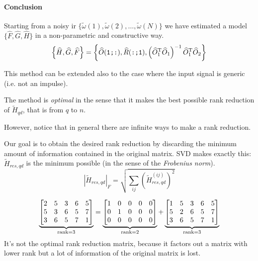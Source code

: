 \paragraph{Conclusion} Starting from a noisy \gls{ir} $\{\widetilde{\omega}(1), \widetilde{\omega}(2), \ldots, \widetilde{\omega}(N)\}$ we have estimated a model $\{\hat{F}, \hat{G}, \hat{H}\}$ in a non-parametric and constructive way.
\[ \left\{\widehat{H}, \widehat{G}, \widehat{F} \right\} = \left \{\widehat{O}(\texttt{1;:}), \widehat{R}(\texttt{:;1}), \left(\widehat{O}_1^{\mathrm{T}}\widehat{O}_1\right)^{-1} \widehat{O}_1^{\mathrm{T}}\widehat{O}_2\right \}\]

\begin{remark}
    This method can be extended also to the case where the input signal is generic (i.e. not an impulse).
\end{remark}

\begin{remark}
    The method is \emph{optimal} in the sense that it makes the best possible rank reduction of $\tilde{H}_{qd}$, that is from $q$ to $n$.
    
    However, notice that in general there are infinite ways to make a rank reduction.
\end{remark}

\begin{remark}
Our goal is to obtain the desired rank reduction by discarding the minimum amount of information contained in the original matrix.
SVD makes exactly this: $\tilde{H}_{res,qd}$ is the minimum possible (in the sense of the \emph{Frobenius norm}).
\[
    \left|\tilde{H}_{res,qd}\right|_F = \sqrt{\sum_{ij} \left(\tilde{H}_{res,qd}^{(ij)} \right)^2}
\]
    
\end{remark}

\begin{example}
    \[
        \underbrace{\begin{bmatrix}
            2 & 5 & 3 & 6 & 5 \\
            5 & 3 & 6 & 5 & 7 \\
            3 & 6 & 5 & 7 & 1
        \end{bmatrix}}_{\operatorname*{rank} = 3}
        =
        \underbrace{\begin{bmatrix}
            1 & 0 & 0 & 0 & 0 \\
            0 & 1 & 0 & 0 & 0 \\
            0 & 0 & 0 & 0 & 0
        \end{bmatrix}}_{\operatorname*{rank} = 2}
        +
        \underbrace{
        \begin{bmatrix}
            1 & 5 & 3 & 6 & 5 \\
            5 & 2 & 6 & 5 & 7 \\
            3 & 6 & 5 & 7 & 1
        \end{bmatrix}}_{\operatorname*{rank} = 3}
    \]
    It's not the optimal rank reduction matrix, because it factors out a matrix with lower rank but a lot of information of the original matrix is lost.
\end{example}


